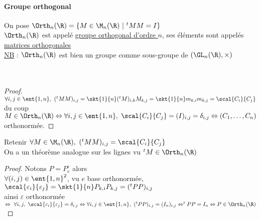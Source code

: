 		\paragraph{Groupe orthogonal}
			On pose $\Orth_n(\R) = \{M\in\M_n(\R) ~|~^tMM = I \}$\\
			$\Orth_n(\R)$ est appelé \uline{groupe orthogonal d'ordre $n$}, ses éléments sont appelés \uline{matrices orthogonales} \trait
		\vspace*{-1.1cm} \\ \uline{NB} : $\Orth_n(\R)$ est bien un groupe comme sous-groupe de $(\GL_n(\R) , \times)$
		\vspace*{0.5cm} \\ 
		\vspace*{0.5cm} \\ 
		\vspace*{0.5cm} \\ 
		\begin{proof}
		$\forall i,j \in \ent{1,n} ,~ (^tMM)_{i,j} = \skt{1}{n} (^tM)_{i,k} M_{k,j} = \skt{1}{n} m_{k,i}m_{k,j} = \scal{C_i}{C_j}$\\
		du coup $M\in \Orth_n(\R) \Leftrightarrow \forall i,j \in \ent{1,n},~ \scal{C_i}{C_j} = (I)_{i,j} = \delta_{i,j} \Leftrightarrow (C_1,\dots , C_n)$ orthonormée.
		\end{proof}
		Retenir $\forall M\in \M_n(\R),~ (^tMM)_{i,j} = \scal{C_i}{C_j}$ \vspace*{0.2cm}\\
		On a un théorème analogue sur les lignes vu $^tM \in \Orth_n(\R)$
		\vspace*{0.5cm} \\ 
		\begin{proof}
		Notons $P=P_e^\varepsilon$ alors\\
		$\forall (i,j) \in\ent{1,n}^2$, vu $e$ base orthonormée, $\scal{\varepsilon_i}{\varepsilon_j} = \skt{1}{n}P_{k,i}P_{k,j} = (^tPP)_{i,j}$\\
		ainsi $\varepsilon$ orthonormée $\Leftrightarrow ~ \forall i,j ,~\scal{\varepsilon_i}{\varepsilon_j} = \delta_{i,j} \Leftrightarrow 
		\forall i,j \in \ent{1,n} ,~(^tPP)_{i,j} = (I_n)_{i,j} \Leftrightarrow ^tPP = I_n \\ \Leftrightarrow P\in \Orth_n(\R)$ 
		\end{proof} ${}$ \traitd

